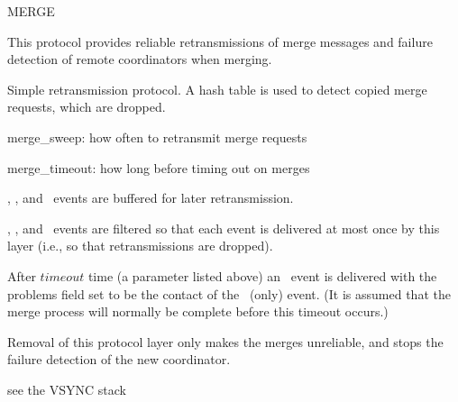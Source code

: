 %
%
%
\begin{Layer}{MERGE}

This protocol provides reliable retransmissions of merge messages and failure
detection of remote coordinators when merging.

\begin{Protocol}
Simple retransmission protocol.  A hash table is used to detect copied
merge requests, which are dropped.
\end{Protocol}

\begin{Parameters}
\item
merge\_sweep: how often to retransmit merge requests
\item
merge\_timeout: how long before timing out on merges
\end{Parameters}

\begin{Properties}
\item
\DnMerge, \DnMergeGranted, and \DnMergeDenied\ events are buffered for later
retransmission.
\item
\UpMergeRequest, \UpMergeGranted, and \UpMergeDenied\ events are filtered
so that each event is delivered at most once by this layer (i.e., so that
retransmissions are dropped).
\item
After $timeout$ time (a parameter listed above) an \UpMergeFailed\ event is
delivered with the problems field set to be the contact of the \DnMerge\
(only) event.  (It is assumed that the merge process will normally be
complete before this timeout occurs.)
\end{Properties}

\begin{Notes}
\item
Removal of this protocol layer only makes the merges unreliable, and
stops the failure detection of the new coordinator.
\end{Notes}

\begin{Sources}
\end{Sources}

\begin{GenEvent}
\genevent{\UpSuspect}
\genevent{\DnMerge}
\genevent{\DnTimer}
\end{GenEvent}

\begin{Testing}
\item see the VSYNC stack
\end{Testing}
\end{Layer}
